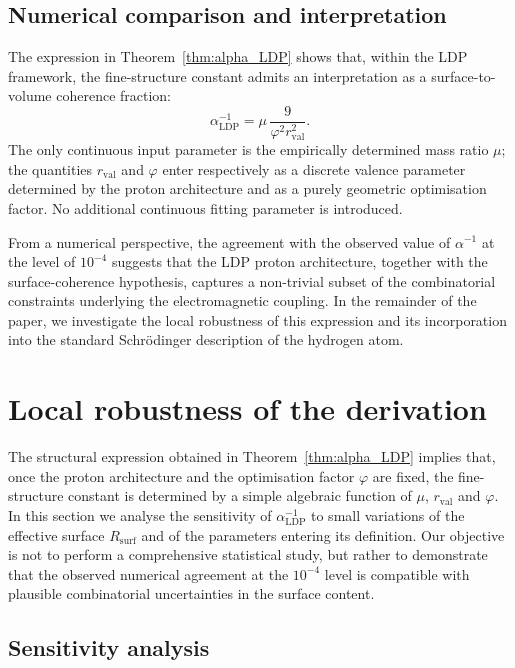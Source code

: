 \documentclass[11pt,a4paper]{article}
\theoremstyle{plain}
\theoremstyle{definition}
\theoremstyle{remark}
\begin{document}
\subsection{Numerical comparison and interpretation}

The expression in Theorem~\ref{thm:alpha_LDP} shows that, within the LDP framework, the fine-structure constant admits an interpretation as a surface-to-volume coherence fraction:
\[
  \alpha_{\mathrm{LDP}}^{-1}
  = \mu\, \frac{9}{\varphi^2 r_{\mathrm{val}}^2}.
\]
The only continuous input parameter is the empirically determined mass ratio \(\mu\); the quantities \(r_{\mathrm{val}}\) and \(\varphi\) enter respectively as a discrete valence parameter determined by the proton architecture and as a purely geometric optimisation factor. No additional continuous fitting parameter is introduced.

From a numerical perspective, the agreement with the observed value of \(\alpha^{-1}\) at the level of \(10^{-4}\) suggests that the LDP proton architecture, together with the surface-coherence hypothesis, captures a non-trivial subset of the combinatorial constraints underlying the electromagnetic coupling. In the remainder of the paper, we investigate the local robustness of this expression and its incorporation into the standard Schrödinger description of the hydrogen atom.

\section{Local robustness of the derivation}

The structural expression obtained in Theorem~\ref{thm:alpha_LDP} implies that, once the proton architecture and the optimisation factor \(\varphi\) are fixed, the fine-structure constant is determined by a simple algebraic function of \(\mu\), \(r_{\mathrm{val}}\) and \(\varphi\). In this section we analyse the sensitivity of \(\alpha_{\mathrm{LDP}}^{-1}\) to small variations of the effective surface \(R_{\mathrm{surf}}\) and of the parameters entering its definition. Our objective is not to perform a comprehensive statistical study, but rather to demonstrate that the observed numerical agreement at the \(10^{-4}\) level is compatible with plausible combinatorial uncertainties in the surface content.

\subsection{Sensitivity analysis}
\end{document}
